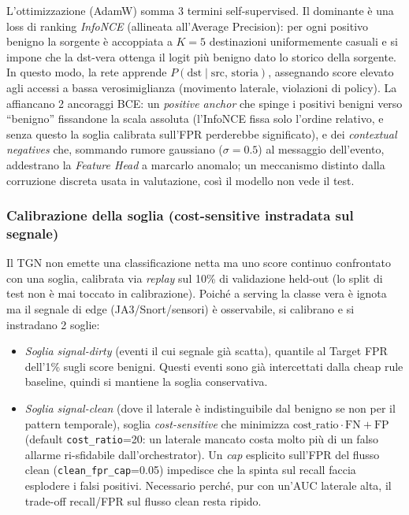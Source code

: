 L'ottimizzazione (AdamW) somma 3 termini self-supervised. Il dominante è una loss di ranking \emph{InfoNCE} (allineata all'Average Precision): per ogni positivo benigno la sorgente è accoppiata a $K{=}5$ destinazioni uniformemente casuali e si impone che la dst-vera ottenga il logit più benigno dato lo storico della sorgente. In questo modo, la rete apprende $P(\text{dst}\mid\text{src, storia})$, assegnando score elevato agli accessi a bassa verosimiglianza (movimento laterale, violazioni di policy). La affiancano 2 ancoraggi BCE: un \emph{positive anchor} che spinge i positivi benigni verso ``benigno'' fissandone la scala assoluta (l'InfoNCE fissa solo l'ordine relativo, e senza questo la soglia calibrata sull'FPR perderebbe significato), e dei \textit{contextual negatives} che, sommando rumore gaussiano ($\sigma{=}0.5$) al messaggio dell'evento, addestrano la \textit{Feature Head} a marcarlo anomalo; un meccanismo distinto dalla corruzione discreta usata in valutazione, così il modello non vede il test.

\subsubsection{Calibrazione della soglia (cost-sensitive instradata sul segnale)}
\label{sec:threshold}

Il TGN non emette una classificazione netta ma uno score continuo confrontato con una soglia, calibrata via \textit{replay} sul 10\% di validazione held-out (lo split di test non è mai toccato in calibrazione). Poiché a serving la classe vera è ignota ma il segnale di edge (JA3/Snort/sensori) è osservabile, si calibrano e si instradano 2 soglie:

\begin{itemize}
    \item \textit{Soglia signal-dirty} (eventi il cui segnale già scatta), quantile al Target FPR dell'1\% sugli score benigni. Questi eventi sono già intercettati dalla cheap rule baseline, quindi si mantiene la soglia conservativa.
    \item \textit{Soglia signal-clean} (dove il laterale è indistinguibile dal benigno se non per il pattern temporale), soglia \emph{cost-sensitive} che minimizza $\text{cost\_ratio}\cdot\text{FN} + \text{FP}$ (default \texttt{cost\_ratio}=20: un laterale mancato costa molto più di un falso allarme ri-sfidabile dall'orchestrator). Un \emph{cap} esplicito sull'FPR del flusso clean (\texttt{clean\_fpr\_cap}=0.05) impedisce che la spinta sul recall faccia esplodere i falsi positivi. Necessario perché, pur con un'AUC laterale alta, il trade-off recall/FPR sul flusso clean resta ripido.
\end{itemize}

